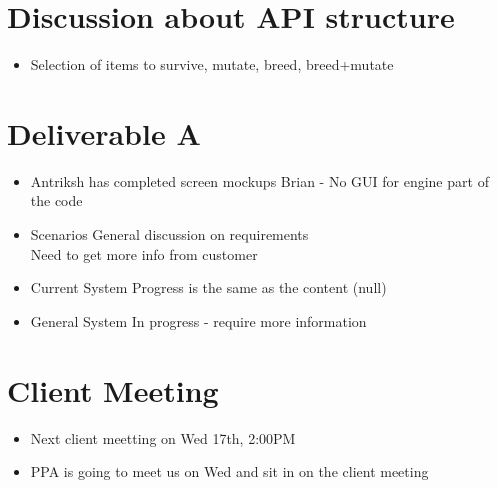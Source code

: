 
\date{15th August, 2011}



\section{Discussion about API structure}
\begin{itemize}
 \item Selection of items to survive, mutate, breed, breed+mutate
\end{itemize}

\section{Deliverable A}
\begin{itemize}
 \item{Antriksh has completed screen mockups}
  Brian - No GUI for engine part of the code \\
 \item{Scenarios}
  General discussion on requirements \\
  Need to get more info from customer
 \item{Current System}
  Progress is the same as the content (null)
 \item{General System}
  In progress - require more information
\end{itemize}

\section{Client Meeting}
\begin{itemize}
 \item Next client meetting on Wed 17th, 2:00PM
 \item PPA is going to meet us on Wed and sit in on the client meeting 
\end{itemize}




